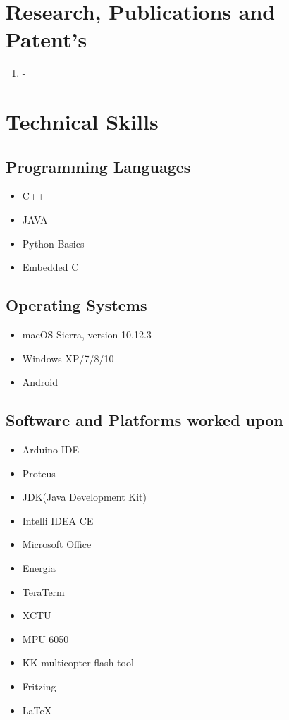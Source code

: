 \documentclass[11pt]{article}
\begin{document}
\begin{minipage}{1.5\linewidth}

\section{\color{blue}Res\color{black}earch, Publications and Patent's}
\begin{enumerate}
\item -
\end{enumerate}

\section{\color{cyan}Tec\color{black}hnical Skills}
\subsection{Programming Languages}
\begin{itemize}
\item C++
\item JAVA
\item Python Basics
\item Embedded C
\end{itemize}

\subsection{Operating Systems}
\begin{itemize}
\item macOS Sierra, version 10.12.3
\item Windows XP/7/8/10
\item Android
\end{itemize}
\subsection{Software and Platforms worked upon}
\begin{itemize}
\item Arduino IDE
\item Proteus
\item JDK(Java Development Kit)
\item Intelli IDEA CE
\item Microsoft Office
\item Energia
\item TeraTerm
\item XCTU
\item MPU 6050
\item KK multicopter flash tool
\item Fritzing
\item LaTeX
\end{itemize}

\end{minipage}
\end{document}
